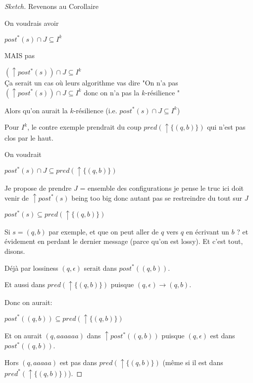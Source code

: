 \begin{proof}[Sketch]
{Revenons au Corollaire

On voudrais avoir

$post^* (s) \cap J \subseteq I^k$

MAIS pas

$ (\uparrow post^* (s)) \cap J \subseteq I^k$ \\


Ça serait un cas où leurs algorithme vas dire 
"On n'a pas $(\uparrow post^* (s)) \cap J \subseteq I^k$ donc on n'a pas la $k$-résilience "

Alors qu'on aurait la $k$-résilience (i.e. $post^* (s) \cap J \subseteq I^k$)

Pour $I^k$, le contre exemple prendrait du coup $pred(\uparrow \{ (q,b)\})$ qui n'est pas clos par le haut.

On voudrait

$post^*(s) \cap J \subseteq pred(\uparrow \{ (q,b)\})$


Je propose de prendre $J$ = ensemble des configurations je pense le truc ici doit venir de
$\uparrow post^* (s)$ being too big
donc autant pas se restreindre du tout sur $J$


$post^*(s) \subseteq pred(\uparrow \{ (q,b)\})$

Si $s=(q,b)$ par exemple, et que on peut aller de $q$ vers $q$ en écrivant un 
$b$ ? et évidement en perdant le dernier message (parce qu'on est lossy). Et c'est tout, disons.

Déjà par lossiness $(q,\epsilon)$ serait dans $post^*((q,b))$.

Et aussi dans $pred(\uparrow \{ (q,b)\})$ puisque $(q,\epsilon) \to (q,b)$.

Donc on aurait:

$post^*((q,b))  \subseteq pred(\uparrow \{ (q,b)\})$

Et on aurait $(q,aaaaaa)$ dans 
$\uparrow post^* ((q,b))$ puisque $(q,\epsilon)$ est dans $post^* ((q,b))$.

Hors $(q,aaaaa)$ est pas dans $pred(\uparrow \{ (q,b)\})$
(même si il est dans $pred^*(\uparrow \{ (q,b)\})$).

}
\fi 
 
\end{proof}


